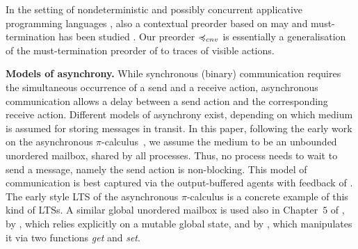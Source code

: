  In the setting of nondeterministic and possibly concurrent
  applicative programming languages
  \cite{DBLP:conf/ppdp/Schmidt-Schauss18,DBLP:journals/corr/abs-2008-13359,
  birkedal-non-determinism},
  also a contextual preorder based on may and must-termination has
  been studied \cite{DBLP:journals/mscs/SabelS08,birkedal-non-determinism}.
  Our preorder $\bhvleqone$ is essentially a
  generalisation of the must-termination preorder of
  \cite{DBLP:journals/mscs/SabelS08} to traces of visible actions.
  

  
{\bfseries Models of asynchrony.}
While synchronous (binary) communication requires
the simultaneous occurrence of a send and a receive action,
asynchronous communication allows a delay between a send action and
the corresponding receive action.  Different models of asynchrony
exist, depending on which medium is assumed for storing messages in
transit. In this paper, following the early work on the asynchronous
$\pi$-calculus~\cite{DBLP:conf/ecoop/HondaT91,boudol:inria-00076939,
  ACS96},
we assume the medium to be an unbounded
unordered mailbox, shared by all processes. Thus, no process needs to
wait to send a message, namely the send action is non-blocking.
  This model of communication is best captured via the output-buffered
  agents with feedback of \cite{DBLP:conf/concur/Selinger97}. 
  The early style LTS of the asynchronous $\pi$-calculus is a concrete example of this
  kind of LTSs.
A similar global unordered mailbox is used %
also in Chapter~$5$ of \cite{DBLP:phd/us/Thati03}, %
by \cite{Brookes2002DeconstructingCA}, which relies explicitly on a mutable
global state, and by \cite{palamidessi_2003}, which
manipulates it via two functions {\em get} and {\em set}.


